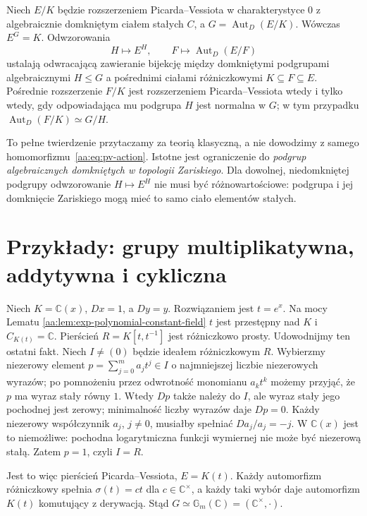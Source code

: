 \begin{twierdzenie}
\label{aa:tw:pv-correspondence}
Niech $E/K$ będzie rozszerzeniem
Picarda--Vessiota w charakterystyce
$0$ z algebraicznie domkniętym
ciałem stałych $C$, a
$G=\operatorname{Aut}_D(E/K)$.
Wówczas $E^G=K$.
Odwzorowania
\[
 H\longmapsto E^H,\qquad
 F\longmapsto\operatorname{Aut}_D(E/F)
\]
ustalają odwracającą zawieranie
bijekcję między domkniętymi
podgrupami algebraicznymi $H\le G$
a pośrednimi ciałami różniczkowymi
$K\subseteq F\subseteq E$.
Pośrednie rozszerzenie $F/K$
jest rozszerzeniem Picarda--Vessiota
wtedy i tylko wtedy, gdy
odpowiadająca mu podgrupa
$H$ jest normalna w $G$;
w tym przypadku
$\operatorname{Aut}_D(F/K)\simeq G/H$.
\end{twierdzenie}

\begin{uwaga}
\label{aa:uw:pv-correspondence-cited}
To pełne twierdzenie przytaczamy
za teorią klasyczną, a nie dowodzimy
z samego homomorfizmu~\eqref{aa:eq:pv-action}.
Istotne jest ograniczenie do
\emph{podgrup algebraicznych domkniętych
w topologii Zariskiego}. Dla
dowolnej, niedomkniętej podgrupy
odwzorowanie $H\mapsto E^H$
nie musi być różnowartościowe:
podgrupa i jej domknięcie Zariskiego
mogą mieć to samo ciało elementów stałych.
\end{uwaga}

\section{Przykłady: grupy multiplikatywna, addytywna i cykliczna}

\begin{przyklad}[Równanie $Dy=y$: grupa multiplikatywna]
\label{aa:prz:pv-multiplicative}
Niech $K=\mathbb C(x)$, $Dx=1$, a
$Dy=y$. Rozwiązaniem jest $t=e^x$.
Na mocy Lematu
\ref{aa:lem:exp-polynomial-constant-field}
$t$ jest przestępny nad $K$
i $C_{K(t)}=\mathbb C$.
Pierścień $R=K[t,t^{-1}]$
jest różniczkowo prosty.
Udowodnijmy ten ostatni fakt.
Niech $I\ne(0)$ będzie
ideałem różniczkowym $R$.
Wybierzmy niezerowy element
$p=\sum_{j=0}^m a_jt^j\in I$
o najmniejszej liczbie
niezerowych wyrazów; po
pomnożeniu przez odwrotność
monomianu $a_kt^k$ możemy
przyjąć, że $p$ ma
wyraz stały równy $1$.
Wtedy $Dp$ także należy do $I$,
ale wyraz stały jego pochodnej
jest zerowy; minimalność
liczby wyrazów daje $Dp=0$.
Każdy niezerowy współczynnik
$a_j$, $j\ne0$, musiałby
spełniać $Da_j/a_j=-j$.
W $\mathbb C(x)$ jest to
niemożliwe: pochodna logarytmiczna
funkcji wymiernej nie może być
niezerową stałą. Zatem $p=1$,
czyli $I=R$.

Jest to więc pierścień
Picarda--Vessiota, $E=K(t)$.
Każdy automorfizm różniczkowy
spełnia $\sigma(t)=ct$ dla
$c\in\mathbb C^\times$, a
każdy taki wybór daje
automorfizm $K(t)$ komutujący
z derywacją. Stąd
$G\simeq\mathbb G_m(\mathbb C)
=(\mathbb C^\times,\cdot)$.
\end{przyklad}

